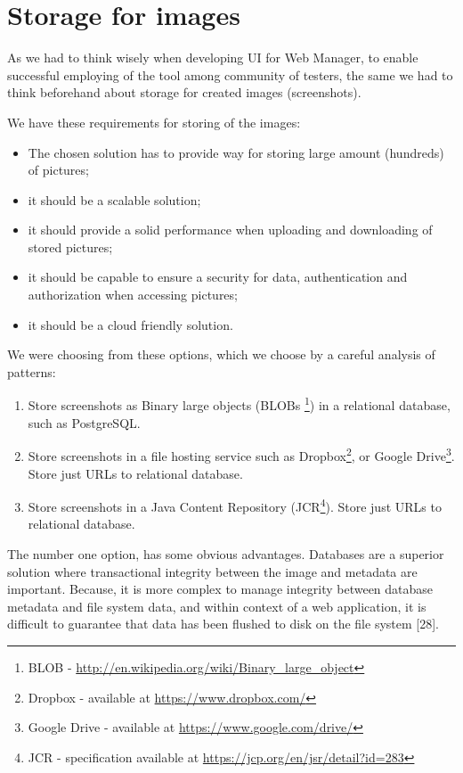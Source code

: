 \documentclass[11pt,oneside,final]{fithesis2}
\begin{document}
\section{Storage for images}
\label{chap:storage}
    As we had to think wisely when developing UI for Web Manager, to enable successful employing of the tool among community of 
    testers, the same we had to think beforehand about storage for created images (screenshots). 
    
    We have these requirements for storing of the images:
    
    \begin{itemize}
     \item The chosen solution has to provide way for storing large amount (hundreds) of pictures;
     \item it should be a scalable solution;
     \item it should provide a solid performance when uploading and downloading of stored pictures;
     \item it should be capable to ensure a security for data, authentication and authorization when accessing pictures;
     \item it should be a cloud friendly solution.
    \end{itemize}
 
    We were choosing from these options, which we choose by a careful analysis of patterns:
    \begin{enumerate}
     \item Store screenshots as Binary large objects (BLOBs 
	   \footnote{BLOB - \url{http://en.wikipedia.org/wiki/Binary_large_object}}) in a relational
	   database, such as PostgreSQL.
     \item Store screenshots in a file hosting service such as Dropbox\footnote{Dropbox - available at \url{https://www.dropbox.com/}}, 
     or Google Drive\footnote{Google Drive - available at \url{https://www.google.com/drive/}}. Store just URLs to relational database.
     \item Store screenshots in a Java Content Repository (JCR\footnote{JCR - specification available at 
	   \url{https://jcp.org/en/jsr/detail?id=283}}). Store just URLs to relational database.
    \end{enumerate}

    The number one option, has some obvious advantages. Databases are a superior solution where transactional integrity between the
    image and metadata are important. Because, it is more complex to manage integrity between database metadata and file system data, 
    and within context of a web application, it is difficult to guarantee that data has been flushed to disk on the file system [28].
    
\end{document}

